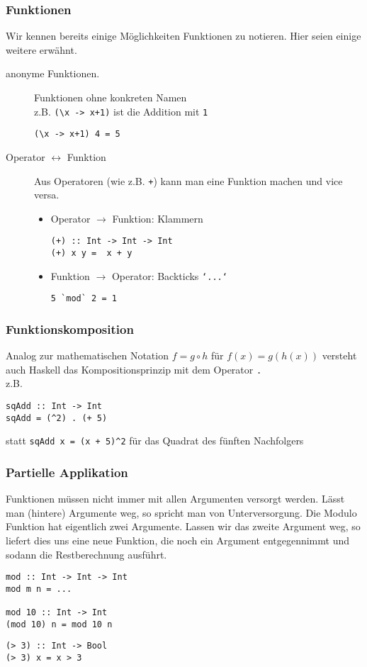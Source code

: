 \documentclass{beamer}
\begin{document}
\begin{frame}[fragile] \frametitle{Funktionen}
	\footnotesize
	Wir kennen bereits einige Möglichkeiten Funktionen zu notieren. Hier seien einige weitere erwähnt.
	\pause
	\begin{description}
		\item[anonyme Funktionen.] Funktionen ohne konkreten Namen \\
		z.B. \lstinline[basicstyle=\ttfamily\normalsize]|(\x -> x+1)| ist die Addition mit \texttt{1} 
		\begin{lstlisting}[style=bg]
(\x -> x+1) 4 = 5
		\end{lstlisting}
		\pause
		\item[Operator $\leftrightarrow$ Funktion] Aus Operatoren (wie z.B. \texttt{+}) kann man eine Funktion machen und vice versa.
		\begin{itemize}
			\item Operator $\to$ Funktion: Klammern
			\begin{lstlisting}[style=bg]
(+) :: Int -> Int -> Int
(+) x y =  x + y
			\end{lstlisting}
			\item Funktion $\to$ Operator: Backticks \texttt{`...`}
			\begin{lstlisting}[style=bg]
5 `mod` 2 = 1
			\end{lstlisting}
		\end{itemize}
	\end{description}
\end{frame}

\begin{frame}[fragile] \frametitle{Funktionskomposition}
	Analog zur mathematischen Notation $f = g \circ h$ für $f(x) = g(h(x))$ versteht auch Haskell das Kompositionsprinzip mit dem Operator \texttt{.} \\
	z.B. 
	\begin{lstlisting}[style=bg]
sqAdd :: Int -> Int
sqAdd = (^2) . (+ 5)
	\end{lstlisting} 
	statt \lstinline[basicstyle=\ttfamily\normalsize]|sqAdd x = (x + 5)^2| für das Quadrat des fünften Nachfolgers
\end{frame}

\begin{frame}[fragile] \frametitle{Partielle Applikation}
	\footnotesize
	Funktionen müssen nicht immer mit allen Argumenten versorgt werden. Lässt man (hintere) Argumente weg, so spricht man von Unterversorgung.
	Die Modulo Funktion hat eigentlich zwei Argumente. Lassen wir das zweite Argument weg, so liefert dies uns eine neue Funktion, die noch ein Argument entgegennimmt und sodann die Restberechnung ausführt.
	\begin{lstlisting}[style=bg]
mod :: Int -> Int -> Int
mod m n = ...

mod 10 :: Int -> Int
(mod 10) n = mod 10 n
	\end{lstlisting}
	\pause
	\begin{lstlisting}[style=bg]
(> 3) :: Int -> Bool
(> 3) x = x > 3
	\end{lstlisting}
\end{frame}
\end{document}

